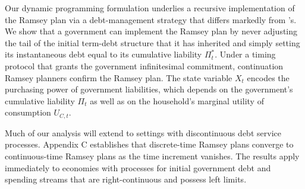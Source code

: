 \documentclass[12pt]{article}
\newcommand{\TS}[1]{{\textcolor{magenta}{#1}}}
\begin{document}
{%

Our dynamic programming formulation underlies a recursive implementation of the Ramsey plan via a debt-management strategy that differs markedly from \citeauthor{LucasStokey1983}'s. %
We show that a government can implement the Ramsey plan by
never adjusting  the  tail of the initial term-debt structure that it has inherited and simply  setting its  instantaneous debt equal to its cumulative liability $\Pi_t^*$. 
Under a timing protocol that grants the government infinitesimal commitment, continuation Ramsey planners confirm the Ramsey plan.
The state variable $X_t$ encodes the purchasing power of government liabilities, which depends on  the government's cumulative liability $\Pi_t$ as well as on  the household's marginal utility of consumption $U_{C,t}$. 

Much of our analysis will extend to settings with discontinuous debt service processes. Appendix C establishes that discrete-time Ramsey plans converge to continuous-time Ramsey plans as the time increment vanishes. The results apply immediately  to economies with processes for initial  government debt and spending streams that are right-continuous and possess left limits. 
%

}
\end{document}
